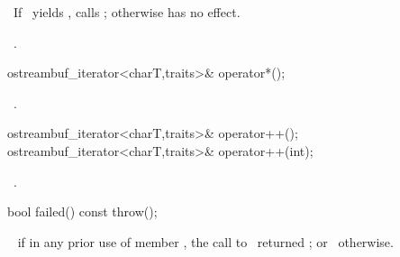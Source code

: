 \documentclass[american,twoside]{book}
\begin{document}
\begin{paras}
\begin{itemdescr}
\pnum
\effects\ 
If
\
yields
,
calls
;
otherwise has no effect.

\pnum
\returns\ 
.
\end{itemdescr}

%
\begin{itemdecl}
ostreambuf_iterator<charT,traits>& operator*();
\end{itemdecl}

\begin{itemdescr}
\pnum
\returns\ 
.
\end{itemdescr}

%
\begin{itemdecl}
ostreambuf_iterator<charT,traits>& operator++();
ostreambuf_iterator<charT,traits>& operator++(int);
\end{itemdecl}

\begin{itemdescr}
\pnum
\returns\ 
.
\end{itemdescr}

%
\begin{itemdecl}
bool failed() const throw();
\end{itemdecl}

\begin{itemdescr}
\pnum
\returns\ 
\tcode{true}
if in any prior use of member
,
the call to
\
returned
;
or
\tcode{false}\
otherwise.
\end{itemdescr}

\end{paras}



\end{document}
